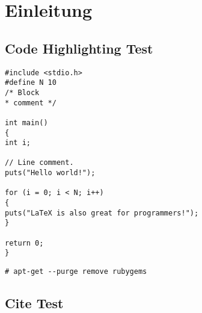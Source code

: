 \chapter{Einleitung}
\label{chap:einleitung}

\section{Code Highlighting Test}

\begin{lstlisting}[style=customc]
#include <stdio.h>
#define N 10
/* Block
* comment */

int main()
{
int i;

// Line comment.
puts("Hello world!");

for (i = 0; i < N; i++)
{
puts("LaTeX is also great for programmers!");
}

return 0;
}
\end{lstlisting}

\bigskip
\begin{lstlisting}[style=BashInputStyle]
# apt-get --purge remove rubygems
\end{lstlisting}



\section{Cite Test}

\cite{ApacheLicense} \cite{HeiseDe} \cite{MiKTeX}


